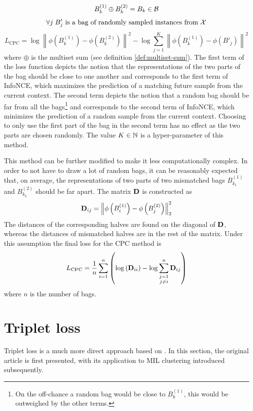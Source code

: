 \[ B_k^{(1)} \oplus B_k^{(2)} = B_k \in \mathcal{B} \]
\[ \forall j \; B'_j \text{ is a bag of randomly sampled instances from } \mathcal{X} \]
\[ L_\mathrm{CPC} = \log \left\lVert \phi \left( B_k^{(1)} \right) - \phi \left( B_k^{(2)} \right) \right\rVert^2 - \log \sum_{j = 1}^K \left\lVert \phi \left( B_k^{(1)} \right) - \phi \left( B'_j \right) \right\rVert^2 \]
where \( \oplus \) is the multiset sum (see definition \ref{def:multiset-sum}). The first term of the loss function depicts the notion that the representations of the two parts of the bag should be close to one another and corresponds to the first term of InfoNCE, which maximizes the prediction of a matching future sample from the current context. The second term depicts the notion that a random bag should be far from all the bags\footnote{On the off-chance a random bag would be close to \( B_k^{(1)} \), this would be outweighed by the other terms.} and corresponds to the second term of InfoNCE, which minimizes the prediction of a random sample from the current context. Choosing to only use the first part of the bag in the second term has no effect as the two parts are chosen randomly. The value \( K \in \mathbb{N} \) is a hyper-parameter of this method.

This method can be further modified to make it less computationally complex. In order to not have to draw a lot of random bags, it can be reasonably expected that, on average, the representations of two parts of two mismatched bags \( B_{k_1}^{(1)} \) and \( B_{k_2}^{(2)} \) should be far apart. The matrix \( \mathbf{D} \) is constructed as
\[ \mathbf{D}_{ij} = \left\lVert \phi \left( B_i^{(1)} \right) - \phi \left( B_j^{(2)} \right) \right\rVert_2^2 \]
The distances of the corresponding halves are found on the diagonal of \( \mathbf{D} \), whereas the distances of mismatched halves are in the rest of the matrix. Under this assumption the final loss for the CPC method is
\[ L_\mathrm{CPC} = \frac{1}{n} \sum_{i = 1}^n \left( \log \left( \mathbf{D}_{ii} \right) - \log \sum_{\substack{j = 1 \\ j \neq i}}^n \mathbf{D}_{ij} \right) \]
where \( n \) is the number of bags.

\section{Triplet loss}
Triplet loss is a much more direct approach based on \cite{weinberger_distance_2006}. In this section, the original article is first presented, with its application to MIL clustering introduced subsequently.

